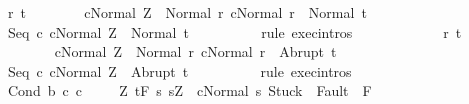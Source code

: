 \begin{isabellebody}
\ r\ t\isanewline
\ \ \ \ \ \ \isamarkupfalse%
\ {\isachardoublequoteopen}{\isasymGamma}{\isasymturnstile}{\isasymlangle}c{}{\isacharcomma}Normal\ Z{\isasymrangle}\ {\isasymRightarrow}\ Normal\ r{\isachardoublequoteclose}\ {\isachardoublequoteopen}{\isasymGamma}{\isasymturnstile}{\isasymlangle}c{}{\isacharcomma}Normal\ r{\isasymrangle}\ {\isasymRightarrow}\ Normal\ t{\isachardoublequoteclose}\isanewline
\ \ \ \ \ \ \isamarkupfalse%
\ \isamarkupfalse%
\ {\isachardoublequoteopen}{\isasymGamma}{\isasymturnstile}{\isasymlangle}Seq\ c{}\ c{}{\isacharcomma}Normal\ Z{\isasymrangle}\ {\isasymRightarrow}\ Normal\ t{\isachardoublequoteclose}\isanewline
\ \ \ \ \ \ \ \ \isamarkupfalse%
\ {\isacharparenleft}rule\ exec{\isachardot}intros{\isacharparenright}\isanewline
\ \ \ \ \isamarkupfalse%
\isanewline
\ \ \ \ \ \ \isamarkupfalse%
\ r\ t\isanewline
\ \ \ \ \ \ \isamarkupfalse%
\ {\isachardoublequoteopen}{\isasymGamma}{\isasymturnstile}{\isasymlangle}c{}{\isacharcomma}Normal\ Z{\isasymrangle}\ {\isasymRightarrow}\ Normal\ r{\isachardoublequoteclose}\ {\isachardoublequoteopen}{\isasymGamma}{\isasymturnstile}{\isasymlangle}c{}{\isacharcomma}Normal\ r{\isasymrangle}\ {\isasymRightarrow}\ Abrupt\ t{\isachardoublequoteclose}\isanewline
\ \ \ \ \ \ \isamarkupfalse%
\ \isamarkupfalse%
\ {\isachardoublequoteopen}{\isasymGamma}{\isasymturnstile}{\isasymlangle}Seq\ c{}\ c{}{\isacharcomma}Normal\ Z{\isasymrangle}\ {\isasymRightarrow}\ Abrupt\ t{\isachardoublequoteclose}\isanewline
\ \ \ \ \ \ \ \ \isamarkupfalse%
\ {\isacharparenleft}rule\ exec{\isachardot}intros{\isacharparenright}\isanewline
\ \ \ \ \isamarkupfalse%
\isanewline
\ \ \isamarkupfalse%
\isanewline
{}\isamarkupfalse%
\isanewline
\ \ \isamarkupfalse%
\ {\isacharparenleft}Cond\ b\ c{}\ c{}{\isacharparenright}\ \isanewline
\ \ \isamarkupfalse%
\ {\isachardoublequoteopen}{\isasymforall}Z{\isachardot}\ {\isasymGamma}{\isacharcomma}{\isasymTheta}{\isasymturnstile}\isactrlsub t\isactrlbsub {\isacharslash}F\isactrlesub \ {\isacharbraceleft}s{\isachardot}\ s{\isacharequal}Z\ {\isasymand}\ {\isasymGamma}{\isasymturnstile}{\isasymlangle}c{}{\isacharcomma}Normal\ s{\isasymrangle}\ {\isasymRightarrow}{\isasymnotin}{\isacharparenleft}{\isacharbraceleft}Stuck{\isacharbraceright}\ {\isasymunion}\ Fault\ {\isacharbackquote}\ {\isacharparenleft}{\isacharminus}F{\isacharparenright}{\isacharparenright}\ {\isasymand}\ \isanewline

\end{isabellebody}

